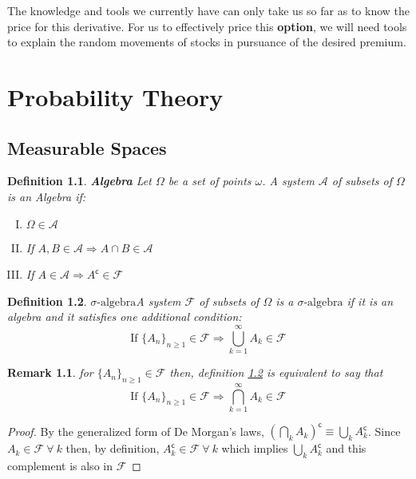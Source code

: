 \documentclass[11pt]{report}
\newtheorem{definition}{Definition}[chapter]
\newtheorem{remark}{Remark}[chapter]
\newcommand{\salg}{\sigma\text{-algebra}}
\begin{document}
\newpage

The knowledge and tools we currently have can only take us so far as to know the price for this derivative. For us to effectively price this \textbf{option}, we will need tools to explain the random movements of stocks in pursuance of the desired premium.

\chapter{Probability Theory}

\section{Measurable Spaces}
\begin{definition}{\textbf{Algebra}}
	Let $\Omega$ be a set of points $\omega$. A system $\mathscr{A}$ of subsets of $\Omega$ is an Algebra if:
	\begin{enumerate}[I.]
		\item $\Omega \in \mathscr{A}$
		\item If $A, B \in \mathscr{A} \Rightarrow A \cap B \in \mathscr{A}$
		\item If $A \in \mathscr{A} \Rightarrow A^\mathsf{c} \in \mathscr{F}$
	\end{enumerate}
\end{definition}

\begin{definition}{\textbf{$\salg$}}\label{salgebra}
	A system $\mathscr{F}$ of subsets of $\Omega$ is a $\salg$ if it is an algebra and it satisfies one additional condition:
	\begin{equation*}
		\text{If } \{A_n\}_{n\geq 1} \in \mathscr{F} \Rightarrow \bigcup_{k=1}^{\infty} A_k \in \mathscr{F} 
	\end{equation*}
\end{definition}

\begin{remark}
	for $\{A_n\}_{n\geq 1} \in \mathscr{F}$ then, definition \ref{salgebra} is equivalent to say that
	\begin{equation*}
		\text{If } \{A_n\}_{n\geq 1} \in \mathscr{F} \Rightarrow \bigcap_{k=1}^{\infty} A_k \in \mathscr{F}
	\end{equation*}
\end{remark}

\begin{proof}
	By the generalized form of De Morgan's laws, $(\bigcap_k A_k)^\mathsf{c} \equiv \bigcup_k A_k^\mathsf{c}$. Since $A_k \in \mathscr{F} \ \forall \ k$ then, by definition,  $A_k^\mathsf{c} \in \mathscr{F} \ \forall \ k$ which implies  $\bigcup_k A_k^\mathsf{c}$ and this complement is also in $\mathscr{F}$
\end{proof}
\end{document}
